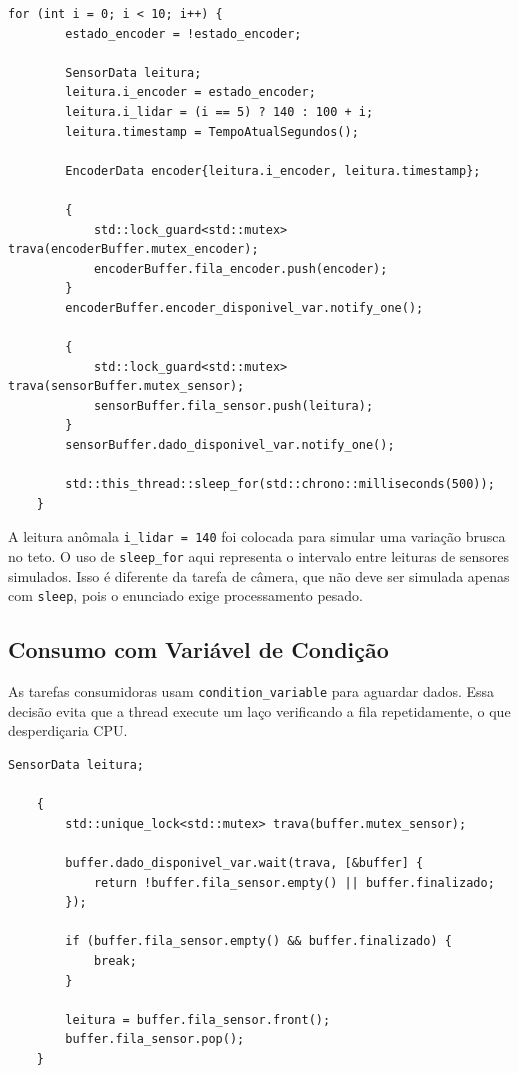 \documentclass[12pt,a4paper]{article}
\begin{document}
    \begin{lstlisting}[style=cppstyle]
    for (int i = 0; i < 10; i++) {
        estado_encoder = !estado_encoder;

        SensorData leitura;
        leitura.i_encoder = estado_encoder;
        leitura.i_lidar = (i == 5) ? 140 : 100 + i;
        leitura.timestamp = TempoAtualSegundos();

        EncoderData encoder{leitura.i_encoder, leitura.timestamp};

        {
            std::lock_guard<std::mutex> trava(encoderBuffer.mutex_encoder);
            encoderBuffer.fila_encoder.push(encoder);
        }
        encoderBuffer.encoder_disponivel_var.notify_one();

        {
            std::lock_guard<std::mutex> trava(sensorBuffer.mutex_sensor);
            sensorBuffer.fila_sensor.push(leitura);
        }
        sensorBuffer.dado_disponivel_var.notify_one();

        std::this_thread::sleep_for(std::chrono::milliseconds(500));
    }
    \end{lstlisting}

    A leitura anômala \texttt{i\_lidar = 140} foi colocada para simular uma variação brusca no teto. O uso de \texttt{sleep\_for} aqui representa o intervalo entre leituras de sensores simulados. Isso é diferente da tarefa de câmera, que não deve ser simulada apenas com \texttt{sleep}, pois o enunciado exige processamento pesado.

    \subsection{Consumo com Variável de Condição}

    As tarefas consumidoras usam \texttt{condition\_variable} para aguardar dados. Essa decisão evita que a thread execute um laço verificando a fila repetidamente, o que desperdiçaria CPU.

    \begin{lstlisting}[style=cppstyle]
    SensorData leitura;

    {
        std::unique_lock<std::mutex> trava(buffer.mutex_sensor);

        buffer.dado_disponivel_var.wait(trava, [&buffer] {
            return !buffer.fila_sensor.empty() || buffer.finalizado;
        });

        if (buffer.fila_sensor.empty() && buffer.finalizado) {
            break;
        }

        leitura = buffer.fila_sensor.front();
        buffer.fila_sensor.pop();
    }
    \end{lstlisting}
\end{document}
